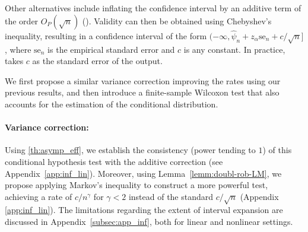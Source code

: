 \documentclass{article}
\theoremstyle{plain}
\theoremstyle{definition}
\theoremstyle{remark}
\begin{document}
Other alternatives include inflating the confidence interval by an additive term of the order $O_P(\sqrt{n})$ (\citet{Dai2024,locoVSShapley}).
%
Validity can then be obtained using Chebyshev's inequality, resulting in a confidence interval of the form $(-\infty, \widehat{\psi}_n + z_\alpha \mathrm{se}_n + c / \sqrt{n}]$, where $\mathrm{se}_n$ is the empirical standard error and $c$ is any constant. 
%
In practice, \citet{locoVSShapley} takes $c$ as the standard error of the output. %

We first propose a similar variance correction improving the rates using our previous results, and then introduce a finite-sample Wilcoxon test that also accounts for the estimation of the conditional distribution.

\paragraph{Variance correction:} Using \cref{th:asymp_eff}, we establish the consistency (power tending to $1$) of this conditional hypothesis test with the additive correction (see Appendix~\ref{app:inf_lin}). Moreover, using Lemma~\ref{lemm:doubl-rob-LM}, we propose applying Markov's inequality to construct a more powerful test, achieving a rate of \( c/n^{\gamma} \) for \( \gamma < 2 \) instead of the standard \( c/\sqrt{n} \) (Appendix \ref{app:inf_lin}). The limitations regarding the extent of interval expansion are discussed in Appendix~\ref{subsec:app_inf}, both for linear and nonlinear settings.
%
\end{document}
